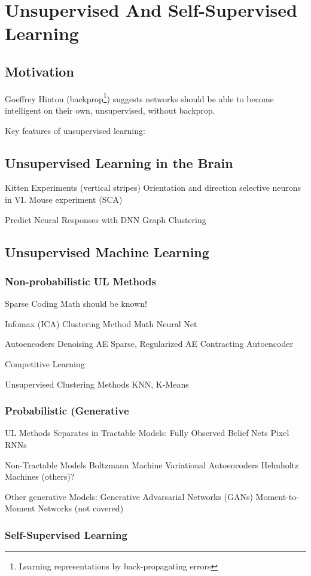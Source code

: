\documentclass[main]{subfiles}
\begin{document}
\newpage
\section{Unsupervised And Self-Supervised Learning}

\subsection{Motivation}

Goeffrey Hinton (backprop\footnote{Learning representations by back-propagating errors}) suggests networks should be able to become intelligent on their own, unsupervised, without backprop.

Key features of unsupervised learning: 

\subsection{Unsupervised Learning in the Brain}

Kitten Experiments (vertical stripes)
Orientation and direction selective neurons in VI.
Mouse experiment (SCA)

Predict Neural Responses with DNN
Graph Clustering

\subsection{Unsupervised Machine Learning}

\subsubsection{Non-probabilistic UL Methods}
Sparse Coding
Math should be known!

Infomax (ICA) Clustering Method
Math
Neural Net


Autoencoders
Denoising AE
Sparse, Regularized AE
Contracting Autoencoder

Competitive Learning

Unsupervised Clustering Methods
KNN, K-Means

\subsubsection{Probabilistic (Generative} UL Methods
Separates in
Tractable Models:
Fully Observed Belief Nets
Pixel RNNs


Non-Tractable Models
Boltzmann Machine
Variational Autoencoders
Helmholtz Machines
(others)?

Other generative Models:
Generative Advarsarial Networks (GANs)
Moment-to-Moment Networks (not covered)

\subsubsection{Self-Supervised Learning}
\end{document}
